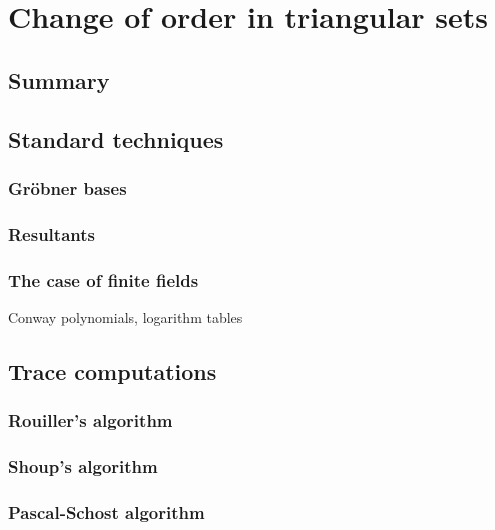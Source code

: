 \newcommand{\AS}[1]{\mathcal{#1}}  %
\newcommand{\biv}[1]{\mathfrak{#1}}  %
\newcommand{\vect}[1]{\vec{#1}}  %
\newcommand{\bs}{\mathbf{s}}  %
\newcommand{\bC}{\mathbf{C}}  %
\newcommand{\bB}{\mathbf{B}}  %
\newcommand{\bD}{\mathbf{D}}  %
\newcommand{\bP}{\mathbf{P}}  %

\newcommand{\sC}{\mathsf{K}}  %
\renewcommand{\L}{\mathsf{L}}  %

\part{Change of order in triangular sets}

\chapter{Summary}


\chapter{Standard techniques}
\section{Gröbner bases}
\section{Resultants}
\section{The case of finite fields}
Conway polynomials, logarithm tables

\chapter{Trace computations}
\section{Rouiller's algorithm}
\section{Shoup's algorithm}
\section{Pascal-Schost algorithm}

